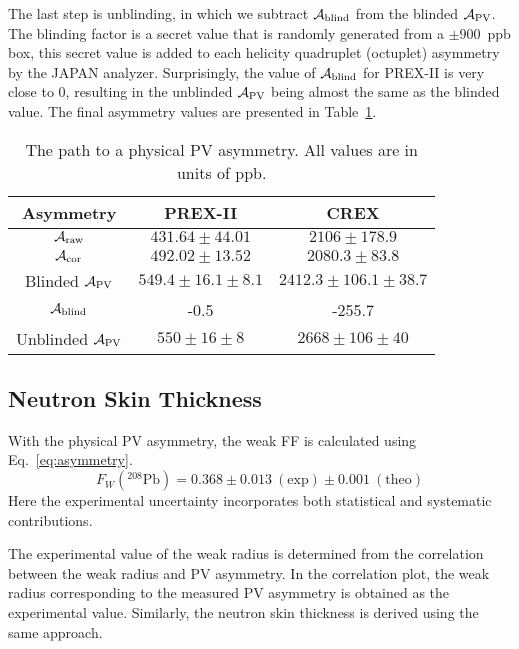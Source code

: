 The last step is unblinding, in which we subtract $\mathcal{A}_{\text{blind}}$ from the blinded
$\mathcal{A}_{\text{PV}}$. The blinding factor is a secret value that is randomly generated 
from a $\pm900$~ppb box, this secret value is 
added to each helicity quadruplet (octuplet) asymmetry by the JAPAN analyzer. 
Surprisingly, the value of $\mathcal{A}_{\text{blind}}$ for PREX-II is very close to 0, 
resulting in the unblinded $\mathcal{A}_{\text{PV}}$ being almost the same as the blinded value. 
The final asymmetry values are presented in Table~\ref{tab:pcrex_final_number}.
\begin{table}[!h]
    \centering
    \begin{tabular}{c | c c}
	\hline
	Asymmetry   & PREX-II	& CREX	\\
	\hline
	$\mathcal{A}_{\text{raw}}$ & $431.64 \pm 44.01$    & $2106 \pm 178.9$	\\
	$\mathcal{A}_{\text{cor}}$ & $492.02 \pm 13.52$    & $2080.3 \pm 83.8$	\\
	Blinded $\mathcal{A}_{\text{PV}}$ & $549.4 \pm 16.1 \pm 8.1$    & $2412.3 \pm 106.1 \pm 38.7$	\\
	$\mathcal{A}_{\text{blind}}$	& -0.5	& -255.7    \\
	\hline
	Unblinded $\mathcal{A}_{\text{PV}}$	& $550 \pm 16 \pm 8$	& $2668 \pm 106 \pm 40$	\\
	\hline
    \end{tabular}
    \caption{The path to a physical PV asymmetry. All values are in units of ppb.}
    \label{tab:pcrex_final_number}
\end{table}

\subsection{Neutron Skin Thickness}
\label{subsec:neutron_skin_thickness}
With the physical PV asymmetry, the weak FF is calculated using Eq.~\ref{eq:asymmetry}.
\begin{equation}
    F_W ({}^{208}\text{Pb}) = 0.368  \pm 0.013 \ (\text{exp}) \pm 0.001 \ (\text{theo})
\end{equation}
Here the experimental uncertainty incorporates both statistical and systematic contributions.

The experimental value of the weak radius is determined from the correlation between the weak radius and PV asymmetry. In the correlation plot, the weak radius corresponding to the measured PV asymmetry is obtained as the experimental value. Similarly, the neutron skin thickness is derived using the same approach.

